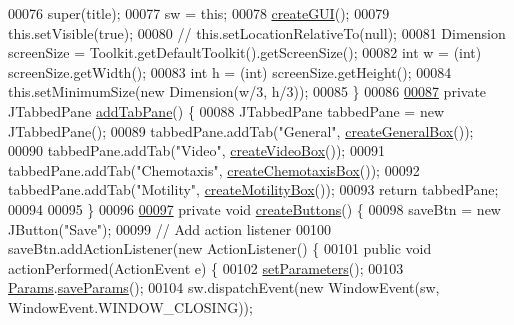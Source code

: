 \begin{DoxyCode}
00076     super(title);
00077     sw = \textcolor{keyword}{this};
00078     \hyperlink{classgui_1_1_settings_window_ae3700d532c2ae5e2171016e13584b2d6}{createGUI}();
00079     this.setVisible(\textcolor{keyword}{true});
00080     \textcolor{comment}{// this.setLocationRelativeTo(null);}
00081     Dimension screenSize = Toolkit.getDefaultToolkit().getScreenSize();
00082     \textcolor{keywordtype}{int} w = (int) screenSize.getWidth();
00083     \textcolor{keywordtype}{int} h = (int) screenSize.getHeight();
00084     this.setMinimumSize(\textcolor{keyword}{new} Dimension(w/3, h/3));
00085   \}
00086 
\hypertarget{_settings_window_8java_source_l00087}{}\hyperlink{classgui_1_1_settings_window_a36518806dd93bf1bcbbd809663c30594}{00087}   \textcolor{keyword}{private} JTabbedPane \hyperlink{classgui_1_1_settings_window_a36518806dd93bf1bcbbd809663c30594}{addTabPane}() \{
00088     JTabbedPane tabbedPane = \textcolor{keyword}{new} JTabbedPane();
00089     tabbedPane.addTab(\textcolor{stringliteral}{"General"}, \hyperlink{classgui_1_1_settings_window_a0e6de45a38ef84cda8e8d6938dd32ad1}{createGeneralBox}());
00090     tabbedPane.addTab(\textcolor{stringliteral}{"Video"}, \hyperlink{classgui_1_1_settings_window_abfe7515fa4028f1aa2cc483ae44f2fc0}{createVideoBox}());
00091     tabbedPane.addTab(\textcolor{stringliteral}{"Chemotaxis"}, \hyperlink{classgui_1_1_settings_window_a770288d77248b778f94df36a48ba95c3}{createChemotaxisBox}());
00092     tabbedPane.addTab(\textcolor{stringliteral}{"Motility"}, \hyperlink{classgui_1_1_settings_window_ac852b9b8b2e0cd2bf5bc764d41e2b0ec}{createMotilityBox}());
00093     \textcolor{keywordflow}{return} tabbedPane;
00094 
00095   \}
00096 
\hypertarget{_settings_window_8java_source_l00097}{}\hyperlink{classgui_1_1_settings_window_a48645e737c205837da587e63e4661cc4}{00097}   \textcolor{keyword}{private} \textcolor{keywordtype}{void} \hyperlink{classgui_1_1_settings_window_a48645e737c205837da587e63e4661cc4}{createButtons}() \{
00098     saveBtn = \textcolor{keyword}{new} JButton(\textcolor{stringliteral}{"Save"});
00099     \textcolor{comment}{// Add action listener}
00100     saveBtn.addActionListener(\textcolor{keyword}{new} ActionListener() \{
00101       \textcolor{keyword}{public} \textcolor{keywordtype}{void} actionPerformed(ActionEvent e) \{
00102         \hyperlink{classgui_1_1_settings_window_a1d6c94586a33965dd4277c7fe62de430}{setParameters}();
00103         \hyperlink{classdata_1_1_params}{Params}.\hyperlink{classdata_1_1_params_a523f79a85b888809ee8b6220ef0e20d1}{saveParams}();
00104         sw.dispatchEvent(\textcolor{keyword}{new} WindowEvent(sw, WindowEvent.WINDOW\_CLOSING));

\end{DoxyCode}
